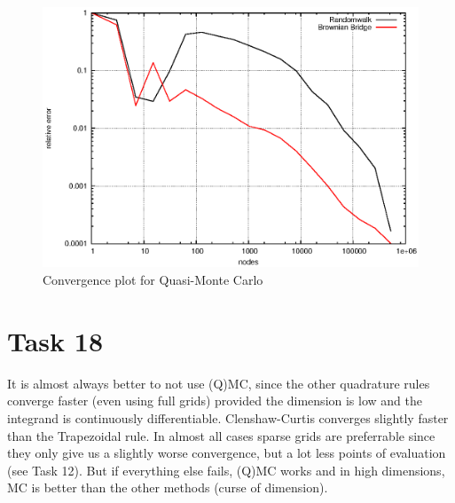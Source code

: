 \documentclass[]{article}
\begin{document}
\begin{figure}[!ht]
\centering
\includegraphics{task17_qmc}
\caption{Convergence plot for Quasi-Monte Carlo}
\label{fig:Task17b}
\end{figure}
\clearpage

\section*{Task 18} It is almost always better to not use (Q)MC, since the other
quadrature rules converge faster (even using full grids) provided the dimension is low and the integrand is continuously differentiable. Clenshaw-Curtis
converges slightly faster than the Trapezoidal rule. In almost all cases sparse
grids are preferrable since they only give us a slightly worse convergence, but
a lot less points of evaluation (see Task 12). But if everything else fails, (Q)MC
works and in high dimensions, MC is better than the other methods (curse of dimension).
\end{document}
